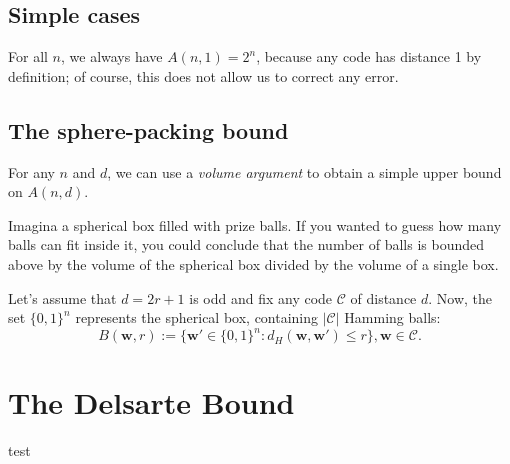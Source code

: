 \subsection{Simple cases}
For all $n$, we always have $A(n,1) = 2^n$, because any code has distance 1 by definition; of course, this does not allow us to correct any error.


\subsection{The sphere-packing bound}
For any $n$ and $d$, we can use a \emph{volume argument} to obtain a simple upper bound on $A(n, d)$.

Imagina a spherical box filled with prize balls. If you wanted to guess how many balls can fit inside it, you could conclude that the number of balls is bounded above by the volume of the spherical box divided by the volume of a single box.

Let's assume that $d = 2r+1$ is odd and fix any code $\mathcal{C}$ of distance $d$. Now, the set $\{0,1\}^n$ represents the spherical box, containing $|\mathcal{C}|$ Hamming balls:
\begin{equation}
    B(\mathbf{w}, r) := \{\mathbf{w}' \in \{0,1\}^n : d_H(\mathbf{w}, \mathbf{w}') \leq r\}, \mathbf{w} \in \mathcal{C}.
\end{equation}

\section{The Delsarte Bound}
test
